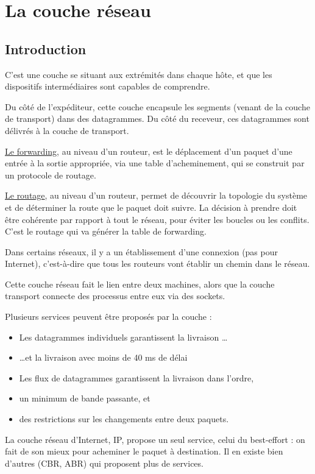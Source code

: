\chapter{La couche réseau}

\section{Introduction}

C'est une couche se situant aux extrémités dans chaque hôte, et que les dispositifs intermédiaires sont capables de comprendre.

Du côté de l'expéditeur, cette couche encapsule les segments (venant de la couche de transport) dans des datagrammes. Du côté du receveur, ces datagrammes sont délivrés à la couche de transport.

\underline{Le forwarding}, au niveau d'un routeur, est le déplacement d'un paquet d'une entrée à la sortie appropriée, via une table d'acheminement, qui se construit par un protocole de routage.

\underline{Le routage}, au niveau d'un routeur, permet de découvrir la topologie du système et de déterminer la route que le paquet doit suivre. La décision à prendre doit être cohérente par rapport à tout le réseau, pour éviter les boucles ou les conflits. C'est le routage qui va générer la table de forwarding.

Dans certains réseaux, il y a un établissement d'une connexion (pas pour Internet), c'est-à-dire que tous les routeurs vont établir un chemin dans le réseau.

Cette couche réseau fait le lien entre deux machines, alors que la couche transport connecte des processus entre eux via des sockets.

Plusieurs services peuvent être proposés par la couche :

\begin{itemize}
	\item Les datagrammes individuels garantissent la livraison
\dots
	\item \dots et la livraison avec moins de 40 ms de délai
	\item Les flux de datagrammes garantissent la livraison dans l'ordre,
	\item un minimum de bande passante, et
	\item des restrictions sur les changements entre deux paquets.
\end{itemize}

La couche réseau d'Internet, IP,  propose un seul service, celui du best-effort : on fait de son mieux pour acheminer le paquet à destination. Il en existe bien d'autres (CBR, ABR) qui proposent plus de services.


